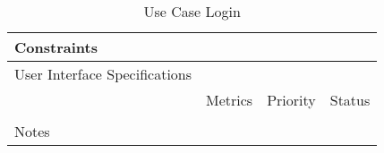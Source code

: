 \begin{table}[H]
\begin{tabularx}{\linewidth}{|l|X|X|X|}
    \hline Constraints                   & \multicolumn{3}{l|}{}                                                                                 \\

    \hline User Interface Specifications & \multicolumn{3}{l|}{}                                                                                 \\

    \hline \multirow{2}{*}{}             & Metrics                                                                           & Priority & Status \\
    \cline{2-4}                          &                                                                                   &          &        \\
    \hline Notes                         & \multicolumn{3}{l|}{}                                                                                 \\
    \hline
  \end{tabularx}
  \caption{Use Case Login}
  \label{tab:use_case_login}
\end{table}

